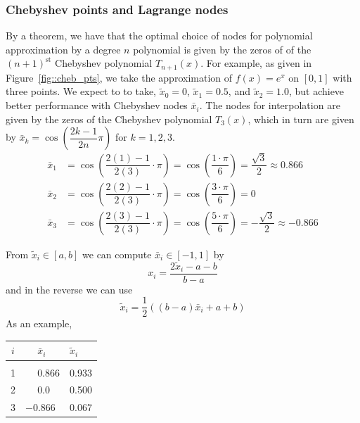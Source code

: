 \documentclass[11pt]{article}
\begin{document}
\subsubsection{Chebyshev points and Lagrange nodes}
By a theorem, we have that the optimal choice of nodes for polynomial approximation by a degree \(n\) polynomial is given by the zeros of of the \((n+1)^\text{st}\) Chebyshev polynomial \(T_{n+1}(x)\).  For example, as given in Figure~\ref{fig::cheb_pts}, we take the approximation of \(f(x) = e^x\) on \([0, 1]\) with three points.  We expect to to take, \(\tilde x_0 = 0\), \(\tilde x_1 = 0.5\), and \(\tilde x_2 = 1.0\), but achieve better performance with Chebyshev nodes \(\bar x_i\).  The nodes for interpolation are given by the zeros of the Chebyshev polynomial \(T_3(x)\), which in turn are given by \(\bar x_k = \cos\left(\dfrac{2k-1}{2n}\pi\right)\) for \(k=1, 2, 3\).
\begin{align*}
\bar x_1 &= \cos\left(\dfrac{2(1)-1}{2(3)}\cdot\pi\right) = \cos\left(\dfrac{1\cdot\pi}{6}\right)= \dfrac{\sqrt{3}}{2} \approx 0.866\\
\bar x_2 &= \cos\left(\dfrac{2(2)-1}{2(3)}\cdot\pi\right) = \cos\left(\dfrac{3\cdot\pi}{6}\right)= 0\\
\bar x_3 &= \cos\left(\dfrac{2(3)-1}{2(3)}\cdot\pi\right) = \cos\left(\dfrac{5\cdot\pi}{6}\right)= -\dfrac{\sqrt{3}}{2} \approx -0.866 
\end{align*}

From \(\tilde x_i \in [a,b]\) we can compute \(\bar x_i \in [-1, 1]\) by \[x_i = \dfrac{2\tilde x_i - a - b}{b-a}\] and in the reverse we can use \[\tilde x_i = \dfrac{1}{2}\left((b-a)\bar x_i + a + b\right)\] As an example,
\begin{center}
\begin{tabular}{cll}
\(i\) & \(\phantom{-}\bar x_i\) & \(\tilde x_i\)\\
\hline \hline
& & \\[-10pt]
1 & \(\phantom{-}0.866\) & 0.933\\  
2 & \(\phantom{-}0.0\) & 0.500 \\
3 & \(-0.866\) & 0.067
\end{tabular}
\end{center}
\end{document}

